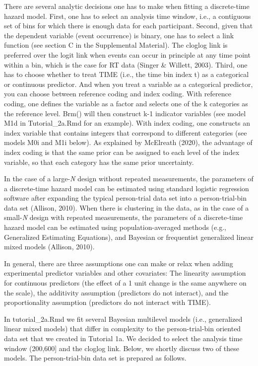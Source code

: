 \documentclass[
  man, donotrepeattitle,floatsintext]{apa6}
\begin{document}
There are several analytic decisions one has to make when fitting a discrete-time hazard model. First, one has to select an analysis time window, i.e., a contiguous set of bins for which there is enough data for each participant. Second, given that the dependent variable (event occurrence) is binary, one has to select a link function (see section C in the Supplemental Material). The cloglog link is preferred over the logit link when events can occur in principle at any time point within a bin, which is the case for RT data (Singer \& Willett, 2003). Third, one has to choose whether to treat TIME (i.e., the time bin index t) as a categorical or continuous predictor. And when you treat a variable as a categorical predictor, you can choose between reference coding and index coding. With reference coding, one defines the variable as a factor and selects one of the k categories as the reference level. Brm() will then construct k-1 indicator variables (see model M1d in Tutorial\_2a.Rmd for an example). With index coding, one constructs an index variable that contains integers that correspond to different categories (see models M0i and M1i below). As explained by McElreath (2020), the advantage of index coding is that the same prior can be assigned to each level of the index variable, so that each category has the same prior uncertainty.

In the case of a large-\emph{N} design without repeated measurements, the parameters of a discrete-time hazard model can be estimated using standard logistic regression software after expanding the typical person-trial data set into a person-trial-bin data set (Allison, 2010). When there is clustering in the data, as in the case of a small-\emph{N} design with repeated measurements, the parameters of a discrete-time hazard model can be estimated using population-averaged methods (e.g., Generalized Estimating Equations), and Bayesian or frequentist generalized linear mixed models (Allison, 2010).

In general, there are three assumptions one can make or relax when adding experimental predictor variables and other covariates: The linearity assumption for continuous predictors (the effect of a 1 unit change is the same anywhere on the scale), the additivity assumption (predictors do not interact), and the proportionality assumption (predictors do not interact with TIME).

In tutorial\_2a.Rmd we fit several Bayesian multilevel models (i.e., generalized linear mixed models) that differ in complexity to the person-trial-bin oriented data set that we created in Tutorial 1a. We decided to select the analysis time window (200,600{]} and the cloglog link. Below, we shortly discuss two of these models. The person-trial-bin data set is prepared as follows.
\end{document}
